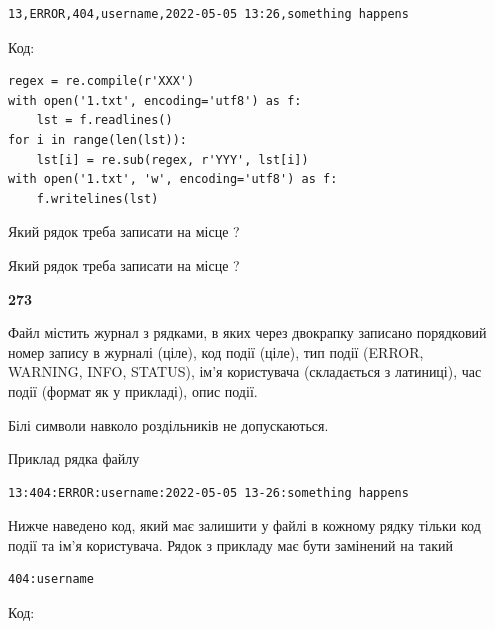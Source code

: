 \begin{verbatim}
13,ERROR,404,username,2022-05-05 13:26,something happens
\end{verbatim}




Код:



\begin{verbatim}
regex = re.compile(r'XXX')
with open('1.txt', encoding='utf8') as f:
    lst = f.readlines()
for i in range(len(lst)):
    lst[i] = re.sub(regex, r'YYY', lst[i])
with open('1.txt', 'w', encoding='utf8') as f:
    f.writelines(lst)
\end{verbatim}







Який рядок треба записати на місце  ?\par
\vspace{5mm}


Який рядок треба записати на місце  ?\par


\newpage

{\begin {center}\textbf{ 273}\end {center}}\par
Файл  містить журнал з рядками, в яких через двокрапку записано поряд\-ко\-вий номер запису в журналі (ціле), код події (ціле), тип події (ERROR, \\WARNING, INFO, STATUS), ім'я користувача (складається з латиниці), час події (фор\-мат як у прикладі), опис події.

Білі символи навколо роздільників не допускаються.

Приклад рядка файлу



\begin{verbatim}
13:404:ERROR:username:2022-05-05 13-26:something happens
\end{verbatim}


Нижче наведено код, який має залишити у файлі в кожному рядку тільки код події та ім'я користувача. Рядок з прикладу має бути замінений на такий



\begin{verbatim}
404:username
\end{verbatim}




Код:



